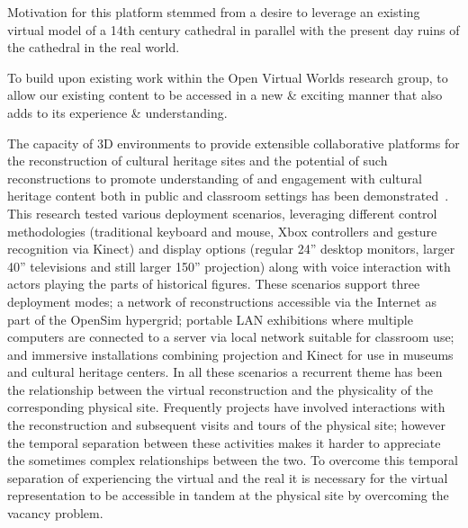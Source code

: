 Motivation for this platform stemmed from a desire to leverage an existing virtual model of a 14th century cathedral in parallel with the present day ruins of the cathedral in the real world.

To build upon existing work within the Open Virtual Worlds research group, to allow our existing content to be accessed in a new \& exciting manner that also adds to its experience \& understanding.



The capacity of 3D environments to provide extensible collaborative platforms for the reconstruction of cultural heritage sites and the potential of such reconstructions to promote understanding of and engagement with cultural heritage content both in public and classroom settings has been demonstrated~\cite{Allison2012,Kennedy2012}. This research tested various deployment scenarios, leveraging different control methodologies (traditional keyboard and mouse, Xbox controllers and gesture recognition via Kinect) and display options (regular 24'' desktop monitors, larger 40'' televisions and still larger 150'' projection) along with voice interaction with actors playing the parts of historical figures. These scenarios support three deployment modes; a network of reconstructions accessible via the Internet as part of the OpenSim hypergrid; portable LAN exhibitions where multiple computers are connected to a server via local network suitable for classroom use; and immersive installations combining projection and Kinect for use in museums and cultural heritage centers. In all these scenarios a recurrent theme has been the relationship between the virtual reconstruction and the physicality of the corresponding physical site. Frequently projects have involved interactions with the reconstruction and subsequent visits and tours of the physical site; however the temporal separation between these activities makes it harder to appreciate the sometimes complex relationships between the two. To overcome this temporal separation of experiencing the virtual and the real it is necessary for the virtual representation to be accessible in tandem at the physical site by overcoming the vacancy problem.

